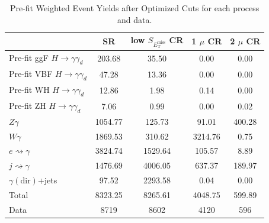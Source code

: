 \begin{table}[htbp]
\centering
\caption{Pre-fit Weighted Event Yields after Optimized Cuts for each process and data.}
\renewcommand{\arraystretch}{1.2}
\begin{tabular}{l | c c c c}
\toprule
& SR & low $S_{E_{\text{T}}^{\text{miss}}}$ CR & 1 $\mu$ CR & 2 $\mu$ CR \\
\midrule
Pre-fit ggF $H \to \gamma\gamma_d$ & 203.68 & 35.50 & 0.00 & 0.00 \\
Pre-fit VBF $H \to \gamma\gamma_d$ & 47.28 & 13.36 & 0.00 & 0.00 \\
Pre-fit WH $H \to \gamma\gamma_d$ & 12.86 & 1.98 & 0.14 & 0.00 \\
Pre-fit ZH $H \to \gamma\gamma_d$ & 7.06 & 0.99 & 0.00 & 0.02 \\
\midrule
$Z\gamma$ & 1054.77 & 125.73 & 91.01 & 400.28 \\
$W\gamma$ & 1869.53 & 310.62 & 3214.76 & 0.75 \\
$e \rightsquigarrow \gamma$ & 3824.74 & 1529.64 & 105.57 & 8.89 \\
$j \rightsquigarrow \gamma$ & 1476.69 & 4006.05 & 637.37 & 189.97 \\
$\gamma(\text{dir})$+jets & 97.52 & 2293.58 & 0.04 & 0.00 \\
\midrule
Total & 8323.25 & 8265.61 & 4048.75 & 599.89 \\
\midrule
Data & 8719 & 8602 & 4120 & 596 \\
\bottomrule
\end{tabular}
\end{table}


